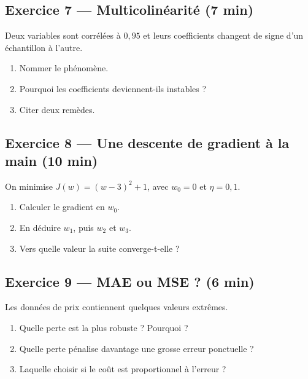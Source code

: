 \subsection*{Exercice 7 --- Multicolinéarité \hfill \normalfont\footnotesize (7 min)}
Deux variables sont corrélées à $0{,}95$ et leurs coefficients changent de signe
d'un échantillon à l'autre.
\begin{enumerate}
  \item Nommer le phénomène.
  \item Pourquoi les coefficients deviennent-ils instables ?
  \item Citer deux remèdes.
\end{enumerate}

\subsection*{Exercice 8 --- Une descente de gradient à la main \hfill \normalfont\footnotesize (10 min)}
On minimise $J(w)=(w-3)^2+1$, avec $w_0=0$ et $\eta=0{,}1$.
\begin{enumerate}
  \item Calculer le gradient en $w_0$.
  \item En déduire $w_1$, puis $w_2$ et $w_3$.
  \item Vers quelle valeur la suite converge-t-elle ?
\end{enumerate}

\subsection*{Exercice 9 --- MAE ou MSE ? \hfill \normalfont\footnotesize (6 min)}
Les données de prix contiennent quelques valeurs extrêmes.
\begin{enumerate}
  \item Quelle perte est la plus robuste ? Pourquoi ?
  \item Quelle perte pénalise davantage une grosse erreur ponctuelle ?
  \item Laquelle choisir si le coût est proportionnel à l'erreur ?
\end{enumerate}

\newpage
